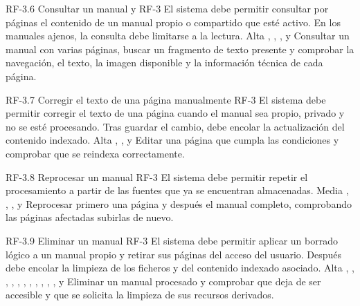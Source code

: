 \requisitoFuncional
{RF-3.6}
{Consultar un manual}
{ y }
{RF-3}
{El sistema debe permitir consultar por páginas el contenido de un manual
propio o compartido que esté activo. En los manuales ajenos, la consulta
debe limitarse a la lectura.
}
{Alta}
{, , ,
 y }
{Consultar un manual con varias páginas, buscar un fragmento de texto presente y comprobar
la navegación, el texto, la imagen disponible y la información técnica de cada
página.}

\requisitoFuncional
{RF-3.7}
{Corregir el texto de una página manualmente}
{}
{RF-3}
{El sistema debe permitir corregir el texto de una página cuando el manual sea
propio, privado y no se esté procesando. Tras guardar el cambio, debe encolar
la actualización del contenido indexado.}
{Alta}
{, ,  y
}
{Editar una página que cumpla las condiciones y comprobar que se reindexa correctamente.}

\requisitoFuncional
{RF-3.8}
{Reprocesar un manual}
{}
{RF-3}
{El sistema debe permitir repetir el procesamiento a partir de las fuentes que
ya se encuentran almacenadas.
}
{Media}
{, , ,
 y }
{Reprocesar primero una página y después el manual completo, comprobando las
páginas afectadas subirlas de nuevo.}

\requisitoFuncional
{RF-3.9}
{Eliminar un manual}
{}
{RF-3}
{El sistema debe permitir aplicar un borrado lógico a un manual propio y retirar
sus páginas del acceso del usuario. Después debe encolar la limpieza de los
ficheros y del contenido indexado asociado.}
{Alta}
{, , ,
, , ,
, , ,
, ,  y
}
{Eliminar un manual procesado y comprobar que deja de ser accesible y que se
solicita la limpieza de sus recursos derivados.}

